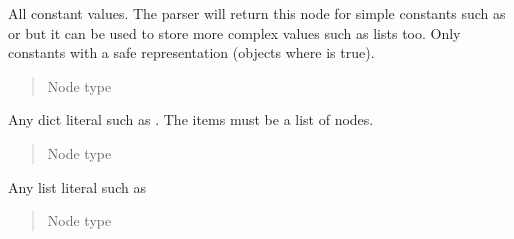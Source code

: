 \documentclass[a4paper,10pt,english]{sphinxmanual}
\begin{document}

\begin{fulllineitems}
\label{extensions:jinja2.nodes.Const}
All constant values.  The parser will return this node for simple
constants such as  or  but it can be used to store more
complex values such as lists too.  Only constants with a safe
representation (objects where  is true).
\begin{quote}\begin{description}
\item[{Node type}] \leavevmode
{\hyperref[extensions:jinja2.nodes.Literal]{}}

\end{description}\end{quote}

\end{fulllineitems}


\begin{fulllineitems}
\label{extensions:jinja2.nodes.Dict}
Any dict literal such as .  The items must be a list of
{\hyperref[extensions:jinja2.nodes.Pair]{}} nodes.
\begin{quote}\begin{description}
\item[{Node type}] \leavevmode
{\hyperref[extensions:jinja2.nodes.Literal]{}}

\end{description}\end{quote}

\end{fulllineitems}


\begin{fulllineitems}
\label{extensions:jinja2.nodes.List}
Any list literal such as \code{{[}1, 2, 3{]}}
\begin{quote}\begin{description}
\item[{Node type}] \leavevmode
{\hyperref[extensions:jinja2.nodes.Literal]{}}

\end{description}\end{quote}

\end{fulllineitems}
\end{document}
